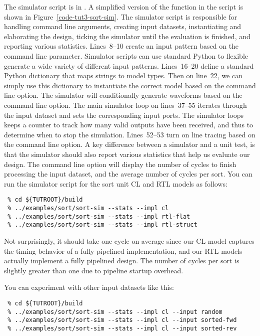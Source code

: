 \documentclass{cbxdoc}
\begin{document}


The simulator script is in . A simplified version of the
 function in the script is shown in
Figure~\ref{code-tut3-sort-sim}. The simulator script is responsible for
handling command line arguments, creating input datasets, instantiating
and elaborating the design, ticking the simulator until the evaluation is
finished, and reporting various statistics. Lines~8--10 create an input
pattern based on the  command line parameter. Simulator
scripts can use standard Python to flexible generate a wide variety of
different input patterns. Lines~16--20 define a standard Python
dictionary that maps strings to model types. Then on line~22, we can
simply use this dictionary to instantiate the correct model based on the
 command line option. The simulator will conditionally
generate waveforms based on the  command line option.
The main simulator loop on lines~37--55 iterates through the input
dataset and sets the corresponding input ports. The simulator loops keeps
a counter to track how many valid outputs have been received, and thus to
determine when to stop the simulation. Lines~52--53 turn on line tracing
based on the  command line option. A key difference between
a simulator and a unit test, is that the simulator should also report
various statistics that help us evaluate our design. The 
command line option will display the number of cycles to finish
processing the input dataset, and the average number of cycles per sort.
You can run the simulator script for the sort unit CL and RTL models as
follows:

\begin{verbatim}
 % cd ${TUTROOT}/build
 % ../examples/sort/sort-sim --stats --impl cl
 % ../examples/sort/sort-sim --stats --impl rtl-flat
 % ../examples/sort/sort-sim --stats --impl rtl-struct
\end{verbatim}

Not surprisingly, it should take one cycle on average since our CL model
captures the timing behavior of a fully pipelined implementation, and our
RTL models actually implement a fully pipelined design. The number of
cycles per sort is slightly greater than one due to pipeline startup
overhead.

\newpage

You can experiment with other input datasets like this:

\begin{verbatim}
 % cd ${TUTROOT}/build
 % ../examples/sort/sort-sim --stats --impl cl --input random
 % ../examples/sort/sort-sim --stats --impl cl --input sorted-fwd
 % ../examples/sort/sort-sim --stats --impl cl --input sorted-rev
\end{verbatim}
\end{document}
